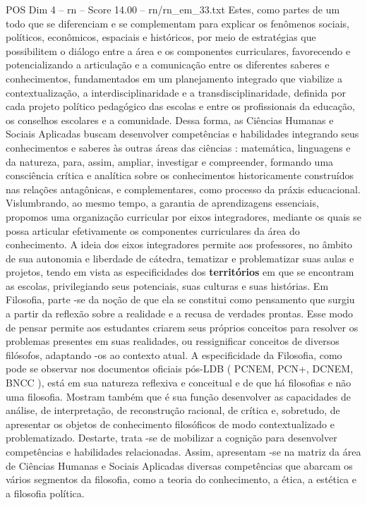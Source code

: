 \begin{textsample}{POS Dim 4 – rn – Score 14.00 – rn/rn\_em\_33.txt}
Estes, como partes de um todo que se diferenciam e se complementam para explicar os fenômenos sociais, políticos, econômicos, espaciais e históricos, por meio de estratégias que possibilitem o diálogo entre a área e os componentes curriculares, favorecendo e potencializando a articulação e a comunicação entre os diferentes saberes e conhecimentos, fundamentados em um planejamento integrado que viabilize a contextualização, a interdisciplinaridade e a transdisciplinaridade, definida por cada projeto político pedagógico das escolas e entre os profissionais da educação, os conselhos escolares e a comunidade.
Dessa forma, as Ciências Humanas e Sociais Aplicadas buscam desenvolver competências e habilidades integrando seus conhecimentos e saberes às outras áreas das ciências : matemática, linguagens e da natureza, para, assim, ampliar, investigar e compreender, formando uma consciência crítica e analítica sobre os conhecimentos historicamente construídos nas relações antagônicas, e complementares, como processo da práxis educacional.
Vislumbrando, ao mesmo tempo, a garantia de aprendizagens essenciais, propomos uma organização curricular por eixos integradores, mediante os quais se possa articular efetivamente os componentes curriculares da área do conhecimento.
A ideia dos eixos integradores permite aos professores, no âmbito de sua autonomia e liberdade de cátedra, tematizar e problematizar suas aulas e projetos, tendo em vista as especificidades dos \textbf{territórios} em que se encontram as escolas, privilegiando seus potenciais, suas culturas e suas histórias.
Em Filosofia, parte -se da noção de que ela se constitui como pensamento que surgiu a partir da reflexão sobre a realidade e a recusa de verdades prontas.
Esse modo de pensar permite aos estudantes criarem seus próprios conceitos para resolver os problemas presentes em suas realidades, ou ressignificar conceitos de diversos filósofos, adaptando -os ao contexto atual.
A especificidade da Filosofia, como pode se observar nos documentos oficiais pós-LDB ( PCNEM, PCN+, DCNEM, BNCC ), está em sua natureza reflexiva e conceitual e de que há filosofias e não uma filosofia.
Mostram também que é sua função desenvolver as capacidades de análise, de interpretação, de reconstrução racional, de crítica e, sobretudo, de apresentar os objetos de conhecimento filosóficos de modo contextualizado e problematizado.
Destarte, trata -se de mobilizar a cognição para desenvolver competências e habilidades relacionadas.
Assim, apresentam -se na matriz da área de Ciências Humanas e Sociais Aplicadas diversas competências que abarcam os vários segmentos da filosofia, como a teoria do conhecimento, a ética, a estética e a filosofia política.

\end{textsample}
